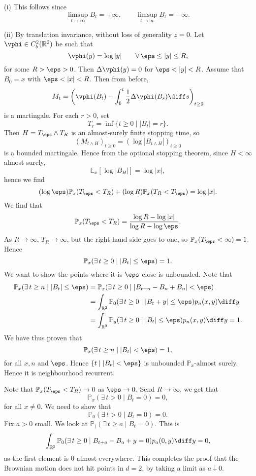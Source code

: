 \documentclass[12pt]{article}
\begin{document}
\begin{proofbox}
	

	(i) This follows since
	\[
	\limsup_{t \to \infty} B_t = +\infty, \qquad \limsup_{t \to \infty} B_t =- \infty.
	\]

	(ii) By translation invariance, without loss of generality $z = 0$. Let $\vphi \in C_b^2(\mathbb{R}^2)$ be such that
	\[
	\vphi(y) = \log |y| \qquad \forall \, \eps \leq |y| \leq R,
	\]
	for some $R > \eps > 0$. Then $\Delta \vphi(y) = 0$ for $\eps < |y| < R$. Assume that $B_0 = x$ with $\eps < |x| < R$. Then from before,
	\[
	M_t = \left( \vphi(B_t) - \int_0^t \frac 12 \Delta \vphi(B_s) \diff s \right)_{t \geq 0}
	\]
	is a martingale. For each $r > 0$, set
	\[
	T_r = \inf\{t \geq 0 \mid |B_t| = r\}.
	\]
	Then $H = T_\eps \wedge T_R$ is an almost-surely finite stopping time, so
	\[
		(M_{t \wedge H})_{t \geq 0} = (\log |B_{t \wedge H}|)_{t \geq 0}
	\]
	is a bounded martingale. Hence from the optional stopping theorem, since $H < \infty$ almost-surely,
	\[
	\mathbb{E}_x[\log |B_{H}|] = \log |x|,
	\]
	hence we find
	\[
		(\log \eps) \mathbb{P}_x(T_\eps < T_R) + (\log R) \mathbb{P}_x(T_R < T_\eps) = \log|x|.
	\]
	We find that
	\[
	\mathbb{P}_x(T_\eps < T_R) = \frac{\log R - \log|x|}{\log R - \log \eps}.
	\]
	As $R \to \infty$, $T_R \to \infty$, but the right-hand side goes to one, so $\mathbb{P}_x(T_\eps < \infty) = 1$. Hence
	\[
	\mathbb{P}_x(\exists \, t \geq 0 \mid |B_t| \leq \eps) = 1.
	\]
	We want to show the points where it is $\eps$-close is unbounded. Note that
	\begin{align*}
		\mathbb{P}_x(\exists \, t \geq n \mid |B_t| \leq \eps) &= \mathbb{P}_x(\exists \, t \geq 0 \mid |B_{t+n} - B_n + B_n| < \eps) \\
								       &= \int_{\mathbb{R}^2} \mathbb{P}_0(\exists \, t \geq 0 \mid |B_t + y| \leq \eps) p_n(x, y) \diff y \\
								       &= \int_{\mathbb{R}^2} \mathbb{P}_y(\exists \, t \geq 0 \mid |B_t| \leq \eps) p_n(x, y) \diff y=  1.
	\end{align*}
	We have thus proven that
	\[
	\mathbb{P}_x(\exists \, t \geq n \mid |B_t| < \eps) = 1,
	\]
	for all $x, n$ and $\eps$. Hence $\{t \mid |B_t| < \eps\}$ is unbounded $\mathbb{P}_x$-almost surely. Hence it is neighbourhood recurrent.

	Note that $\mathbb{P}_x(T_\eps < T_R) \to 0$ as $\eps \to 0$. Send $R \to \infty$, we get that
	\[
	\mathbb{P}_x(\exists \, t > 0 \mid B_t = 0) = 0,
	\]
	for all $x \neq 0$. We need to show that
	\[
	\mathbb{P}_0(\exists \, t > 0 \mid B_t = 0) = 0.
	\]
	Fix $a > 0$ small. We look at $\mathbb{P}_)(\exists \, t \geq a \mid B_t = 0)$. This is
	\[
	\int_{\mathbb{R}^2} \mathbb{P}_0(\exists \, t \geq 0 \mid B_{t + a} - B_a + y = 0) p_a(0, y) \diff y = 0,
	\]
	as the first element is $0$ almost-everywhere. This completes the proof that the Brownian motion does not hit points in $d = 2$, by taking a limit as $a \downarrow 0$.


\end{proofbox}
\end{document}
